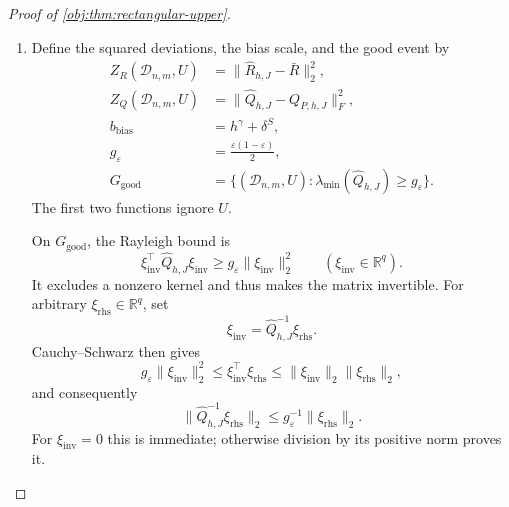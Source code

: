 \documentclass[11pt]{article}
\begin{document}
\begin{proof}[Proof of \cref{obj:thm:rectangular-upper}]
\begin{enumerate}
\item Define the squared deviations, the bias scale, and the good event by
\[
\begin{aligned}
Z_R(\mathcal D_{n,m},U)
 &=\|\widehat R_{h,J}-\bar R\|_2^2,\\
Z_Q(\mathcal D_{n,m},U)
 &=\|\widehat Q_{h,J}-Q_{P,h,J}\|_F^2,\\
b_{\mathrm{bias}}&=h^\gamma+\delta^S,\\
g_\varepsilon&=\frac{\varepsilon(1-\varepsilon)}2,\\
G_{\mathrm{good}}
 &=\{(\mathcal D_{n,m},U):
       \lambda_{\min}(\widehat Q_{h,J})\ge g_\varepsilon\}.
\end{aligned}
\]
The first two functions ignore \(U\).

On \(G_{\mathrm{good}}\), the Rayleigh bound is
\[
\xi_{\mathrm{inv}}^\top\widehat Q_{h,J}\xi_{\mathrm{inv}}
 \ge g_\varepsilon\|\xi_{\mathrm{inv}}\|_2^2
\qquad(\xi_{\mathrm{inv}}\in\mathbb R^q).
\]
It excludes a nonzero kernel and thus makes the matrix invertible.
For arbitrary \(\xi_{\mathrm{rhs}}\in\mathbb R^q\), set
\[
\xi_{\mathrm{inv}}=\widehat Q_{h,J}^{-1}\xi_{\mathrm{rhs}}.
\]
Cauchy--Schwarz then gives
\[
g_\varepsilon\|\xi_{\mathrm{inv}}\|_2^2
\le \xi_{\mathrm{inv}}^\top\xi_{\mathrm{rhs}}
\le \|\xi_{\mathrm{inv}}\|_2\|\xi_{\mathrm{rhs}}\|_2,
\]
and consequently
\[
\|\widehat Q_{h,J}^{-1}\xi_{\mathrm{rhs}}\|_2
\le g_\varepsilon^{-1}\|\xi_{\mathrm{rhs}}\|_2.
\]
For \(\xi_{\mathrm{inv}}=0\) this is immediate; otherwise division by its positive norm proves it.


\end{enumerate}
\end{proof}
\end{document}
